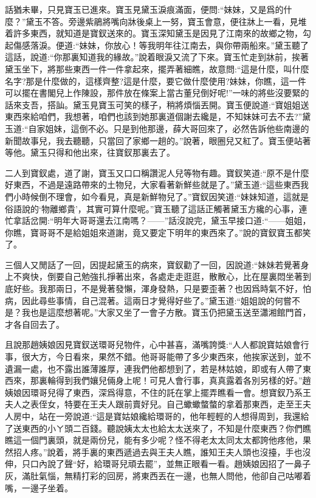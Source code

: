\begin{parag}
    話猶未畢，只見寶玉已進來。寶玉見黛玉淚痕滿面，便問:“妹妹，又是爲的什麼？”黛玉不答。旁邊紫鵑將嘴向牀後桌上一努，寶玉會意，便往牀上一看，見堆着許多東西，就知道是寶釵送來的。寶玉深知黛玉是因見了江南來的故鄉之物，勾起傷感落淚。便道:“妹妹，你放心！等我明年往江南去，與你帶兩船來。”黛玉聽了這話，說道:“你那裏知道我的緣故。”說着眼淚又流了下來。寶玉忙走到牀前，挨著黛玉坐下，將那些東西一件一件拿起來，擺弄著細瞧，故意問:“這是什麼，叫什麼名字?那是什麼做的，這樣齊整?這是什麼，要它做什麼使用?妹妹，你瞧，這一件可以擺在書閣兒上作陳設，那件放在條案上當古董兒倒好呢!”一味的將些沒要緊的話來支吾，搭訕。黛玉見寶玉可笑的樣子，稍將煩惱丟開。寶玉便說道:“寶姐姐送東西來給咱們，我想著，咱們也該到她那裏道個謝去纔是，不知妹妹可去不去?”黛玉道:“自家姐妹，這倒不必。只是到他那邊，薛大哥回來了，必然告訴他些南邊的新聞故事兒，我去聽聽，只當回了家鄉一趟的。”說著，眼圈兒又紅了。寶玉便站著等他。黛玉只得和他出來，往寶釵那裏去了。
\end{parag}


\begin{parag}
    二人到寶釵處，道了謝，寶玉又口口稱讚泥人兒等物有趣。寶釵笑道:“原不是什麼好東西，不過是遠路帶來的土物兒，大家看著新鮮些就是了。”黛玉道:“這些東西我們小時候倒不理會，如今看見，真是新鮮物兒了。”寶釵因笑道:“妹妹知道，這就是俗語說的‘物離鄉貴’，其實可算什麼呢。”寶玉聽了這話正觸著黛玉方纔的心事，連忙拿話岔開:“明年大哥哥還去江南嗎？——”話沒說完，黛玉早接口道:“——姐姐，你瞧，寶哥哥不是給姐姐來道謝，竟又要定下明年的東西來了。”說的寶釵寶玉都笑了。
\end{parag}


\begin{parag}
    三個人又閒話了一回，因提起黛玉的病來，寶釵勸了一回，因說道:“妹妹若覺著身上不爽快，倒要自己勉強扎掙著出來，各處走走逛逛，散散心，比在屋裏悶坐著到底好些。我那兩日，不是覺著發懶，渾身發熱，只是要歪著？也因爲時氣不好，怕病，因此尋些事情，自己混著。這兩日才覺得好些了。”黛玉道:“姐姐說的何嘗不是？我也是這麼想著呢。”大家又坐了一會子方散。寶玉仍把黛玉送至瀟湘館門首，才各自回去了。
\end{parag}


\begin{parag}
    且說那趙姨娘因見寶釵送環哥兒物件，心中甚喜，滿嘴誇獎:“人人都說寶姑娘會行事，很大方，今日看來，果然不錯。他哥哥能帶了多少東西來，他挨家送到，並不遺漏一處，也不露出誰薄誰厚，連我們他都想到了，若是林姑娘，即或有人帶了東西來，那裏輪得到我們孃兒倆身上呢！可見人會行事，真真露着各別另樣的好。”趙姨娘因環哥兒得了東西，深爲得意，不住的託在掌上擺弄瞧看一會。想寶釵乃系王夫人之表侄女，特要在王夫人跟前賣好兒。自己蠍蠍螫螫的拿着那東西，走至王夫人房中，站在一旁說道:“這是寶姑娘纔給環哥的，他年輕輕的人想得周到，我還給了送東西的小ㄚ頭二百錢。聽說姨太太也給太太送來了，不知是什麼東西？你們瞧瞧這一個門裏頭，就是兩份兒，能有多少呢？怪不得老太太同太太都誇他疼他，果然招人疼。”說着，將手裏的東西遞過去與王夫人瞧，誰知王夫人頭也沒擡，手也沒伸，只口內說了聲“好，給環哥兒頑去罷”，並無正眼看一看。趙姨娘因招了一鼻子灰，滿肚氣惱，無精打彩的回房，將東西丟在一邊，也無人問他，他卻自己咕嘟着嘴，一邊子坐着。
\end{parag}


